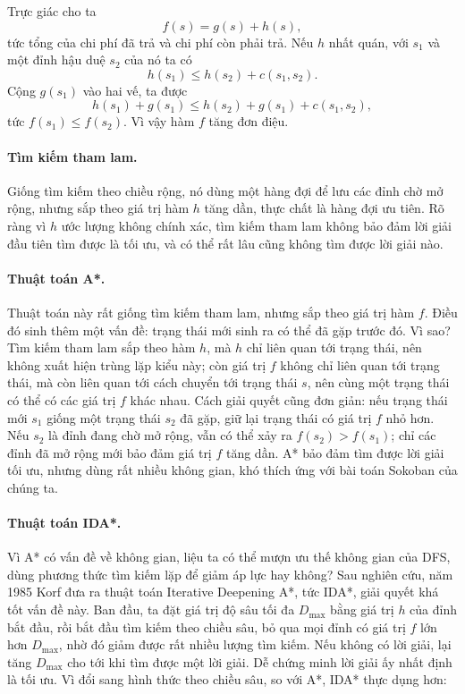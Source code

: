 \documentclass[11pt]{article}
\begin{document}
Trực giác cho ta
\[
  f(s)=g(s)+h(s),
\]
tức tổng của chi phí đã trả và chi phí còn phải trả. Nếu \(h\) nhất quán, với
\(s_1\) và một đỉnh hậu duệ \(s_2\) của nó ta có
\[
  h(s_1)\le h(s_2)+c(s_1,s_2).
\]
Cộng \(g(s_1)\) vào hai vế, ta được
\[
  h(s_1)+g(s_1)\le h(s_2)+g(s_1)+c(s_1,s_2),
\]
tức \(f(s_1)\le f(s_2)\). Vì vậy hàm \(f\) tăng đơn điệu.

\paragraph{Tìm kiếm tham lam.}
Giống tìm kiếm theo chiều rộng, nó dùng một hàng đợi để lưu các đỉnh chờ mở
rộng, nhưng sắp theo giá trị hàm \(h\) tăng dần, thực chất là hàng đợi ưu
tiên. Rõ ràng vì \(h\) ước lượng không chính xác, tìm kiếm tham lam không bảo
đảm lời giải đầu tiên tìm được là tối ưu, và có thể rất lâu cũng không tìm
được lời giải nào.

\paragraph{Thuật toán A*.}
Thuật toán này rất giống tìm kiếm tham lam, nhưng sắp theo giá trị hàm \(f\).
Điều đó sinh thêm một vấn đề: trạng thái mới sinh ra có thể đã gặp trước đó.
Vì sao? Tìm kiếm tham lam sắp theo hàm \(h\), mà \(h\) chỉ liên quan tới
trạng thái, nên không xuất hiện trùng lặp kiểu này; còn giá trị \(f\) không
chỉ liên quan tới trạng thái, mà còn liên quan tới cách chuyển tới trạng thái
\(s\), nên cùng một trạng thái có thể có các giá trị \(f\) khác nhau. Cách
giải quyết cũng đơn giản: nếu trạng thái mới \(s_1\) giống một trạng thái
\(s_2\) đã gặp, giữ lại trạng thái có giá trị \(f\) nhỏ hơn. Nếu \(s_2\) là
đỉnh đang chờ mở rộng, vẫn có thể xảy ra \(f(s_2)>f(s_1)\); chỉ các đỉnh đã
mở rộng mới bảo đảm giá trị \(f\) tăng dần. A* bảo đảm tìm được lời giải tối
ưu, nhưng dùng rất nhiều không gian, khó thích ứng với bài toán Sokoban của
chúng ta.

\paragraph{Thuật toán IDA*.}
Vì A* có vấn đề về không gian, liệu ta có thể mượn ưu thế không gian của DFS,
dùng phương thức tìm kiếm lặp để giảm áp lực hay không? Sau nghiên cứu, năm
1985 Korf đưa ra thuật toán Iterative Deepening A*, tức IDA*, giải quyết khá
tốt vấn đề này. Ban đầu, ta đặt giá trị độ sâu tối đa \(D_{\max}\) bằng giá
trị \(h\) của đỉnh bắt đầu, rồi bắt đầu tìm kiếm theo chiều sâu, bỏ qua mọi
đỉnh có giá trị \(f\) lớn hơn \(D_{\max}\), nhờ đó giảm được rất nhiều lượng
tìm kiếm. Nếu không có lời giải, lại tăng \(D_{\max}\) cho tới khi tìm được
một lời giải. Dễ chứng minh lời giải ấy nhất định là tối ưu. Vì đổi sang
hình thức theo chiều sâu, so với A*, IDA* thực dụng hơn:
\end{document}
